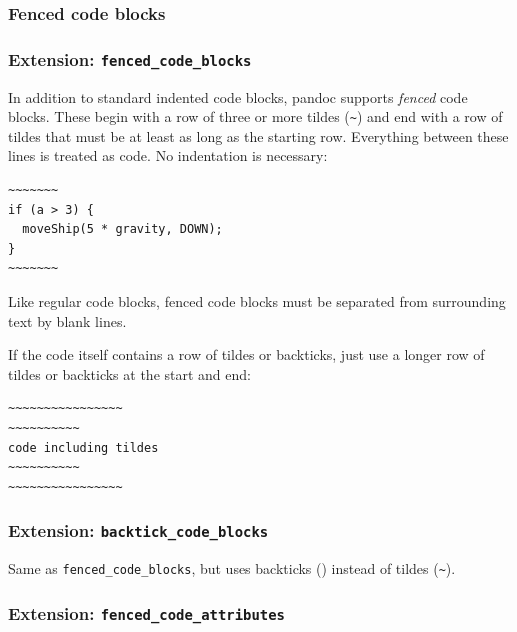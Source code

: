 \documentclass[
]{article}
\begin{document}
\hypertarget{fenced-code-blocks}{%
\subsubsection{Fenced code blocks}\label{fenced-code-blocks}}

\hypertarget{extension-fenced_code_blocks}{%
\subsubsection{\texorpdfstring{Extension:
\texttt{fenced\_code\_blocks}}{Extension: fenced\_code\_blocks}}\label{extension-fenced_code_blocks}}

In addition to standard indented code blocks, pandoc supports
\emph{fenced} code blocks. These begin with a row of three or more
tildes (\texttt{\textasciitilde{}}) and end with a row of tildes that
must be at least as long as the starting row. Everything between these
lines is treated as code. No indentation is necessary:

\begin{verbatim}
~~~~~~~
if (a > 3) {
  moveShip(5 * gravity, DOWN);
}
~~~~~~~
\end{verbatim}

Like regular code blocks, fenced code blocks must be separated from
surrounding text by blank lines.

If the code itself contains a row of tildes or backticks, just use a
longer row of tildes or backticks at the start and end:

\begin{verbatim}
~~~~~~~~~~~~~~~~
~~~~~~~~~~
code including tildes
~~~~~~~~~~
~~~~~~~~~~~~~~~~
\end{verbatim}

\hypertarget{extension-backtick_code_blocks}{%
\subsubsection{\texorpdfstring{Extension:
\texttt{backtick\_code\_blocks}}{Extension: backtick\_code\_blocks}}\label{extension-backtick_code_blocks}}

Same as \texttt{fenced\_code\_blocks}, but uses backticks
(\texttt{\textasciigrave{}}) instead of tildes
(\texttt{\textasciitilde{}}).

\hypertarget{extension-fenced_code_attributes}{%
\subsubsection{\texorpdfstring{Extension:
\texttt{fenced\_code\_attributes}}{Extension: fenced\_code\_attributes}}\label{extension-fenced_code_attributes}}
\end{document}
